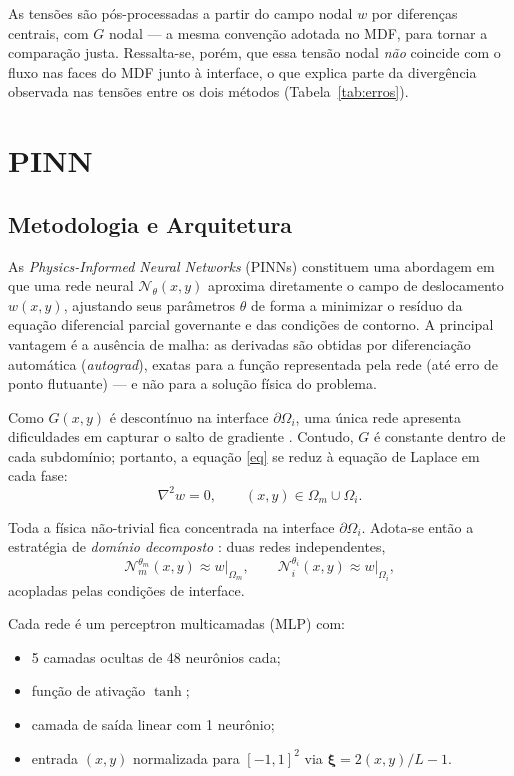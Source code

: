 \documentclass[brazil]{TCAM} %
\begin{document}
As tensões são pós-processadas a partir do campo nodal $w$ por diferenças centrais,
com $G$ nodal --- a mesma convenção adotada no MDF, para tornar a comparação justa.
Ressalta-se, porém, que essa tensão nodal \emph{não} coincide com o fluxo nas faces
do MDF junto à interface, o que explica parte da divergência observada nas tensões
entre os dois métodos (Tabela~\ref{tab:erros}).
\section{PINN}

\subsection{Metodologia e Arquitetura}

As \textit{Physics-Informed Neural Networks} (PINNs) constituem uma abordagem em
que uma rede neural $\mathcal{N}_\theta(x,y)$ aproxima diretamente o campo de
deslocamento $w(x,y)$, ajustando seus parâmetros $\theta$ de forma a minimizar o
resíduo da equação diferencial parcial governante e das condições de contorno. A principal vantagem é a ausência de malha: as derivadas
são obtidas por diferenciação automática (\textit{autograd}), exatas para a função
representada pela rede (até erro de ponto flutuante) --- e não para a solução física
do problema.

Como $G(x,y)$ é descontínuo na interface $\partial\Omega_i$, uma única rede
apresenta dificuldades em capturar o salto de gradiente \cite{wu2023convergence,tseng2023cusp}. Contudo, $G$ é constante
dentro de cada subdomínio; portanto, a equação \eqref{eq} se reduz à equação de
Laplace em cada fase:
\begin{equation}
    \nabla^2 w = 0, \qquad (x,y) \in \Omega_m \cup \Omega_i.
\end{equation}

Toda a física não-trivial fica concentrada na interface $\partial\Omega_i$. Adota-se
então a estratégia de \textit{domínio decomposto} \cite{jagtap2020extended}: duas redes independentes,
\begin{equation*}
    \mathcal{N}_m^{\theta_m}(x,y) \approx w\big|_{\Omega_m}, \qquad
    \mathcal{N}_i^{\theta_i}(x,y) \approx w\big|_{\Omega_i},
\end{equation*}
acopladas pelas condições de interface.

Cada rede é um perceptron multicamadas (MLP) com:
\begin{itemize}
    \item 5 camadas ocultas de 48 neurônios cada;
    \item função de ativação $\tanh$;
    \item camada de saída linear com 1 neurônio;
    \item entrada $(x,y)$ normalizada para $[-1,1]^2$ via
          $\boldsymbol{\xi} = 2(x,y)/L - 1$.
\end{itemize}
\end{document}
